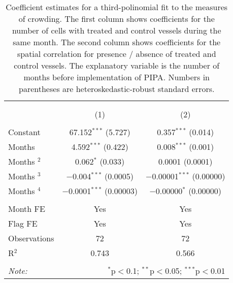 
\begin{table}[!htbp] \centering 
  \caption{\label{tab:sp_corr}Coefficient estimates for a third-polinomial fit to the measures of crowding. The first column shows coefficients for the number of cells with treated and control vessels during the same month. The second column shows coefficients for the spatial correlation for presence / absence of treated and control vessels. The explanatory variable is the number of months before implementation of PIPA. Numbers in parentheses are heteroskedastic-robust standard errors.} 
  \label{} 
\footnotesize 
\begin{tabular}{@{\extracolsep{1pt}}lcc} 
\\[-1.8ex]\hline 
\hline \\[-1.8ex] 
\\[-1.8ex] & (1) & (2)\\ 
\hline \\[-1.8ex] 
 Constant & 67.152$^{***}$ (5.727) & 0.357$^{***}$ (0.014) \\ 
  Months & 4.592$^{***}$ (0.422) & 0.008$^{***}$ (0.001) \\ 
  Months $^2$ & 0.062$^{*}$ (0.033) & 0.0001 (0.0001) \\ 
  Months $^3$ & $-$0.004$^{***}$ (0.0005) & $-$0.00001$^{***}$ (0.00000) \\ 
  Months $^4$ & $-$0.0001$^{***}$ (0.00003) & $-$0.00000$^{*}$ (0.00000) \\ 
 \hline \\[-1.8ex] 
Month FE & Yes & Yes \\ 
Flag FE & Yes & Yes \\ 
Observations & 72 & 72 \\ 
R$^{2}$ & 0.743 & 0.566 \\ 
\hline 
\hline \\[-1.8ex] 
\textit{Note:}  & \multicolumn{2}{r}{$^{*}$p$<$0.1; $^{**}$p$<$0.05; $^{***}$p$<$0.01} \\ 
\end{tabular} 
\end{table} 
